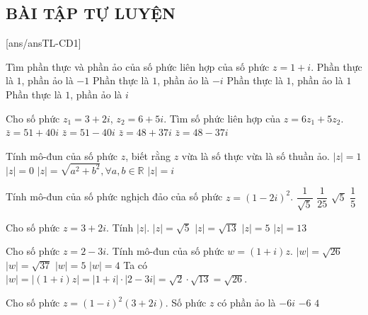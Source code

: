 \NOTE
\subsection{BÀI TẬP TỰ LUYỆN}
[ans/ansTL-CD1]
\setcounter{ex}{0}
\begin{ex}%
	Tìm phần thực và phần ảo của số phức liên hợp của số phức $z=1+i.$
	\choice
	{\True Phần thực là $1$, phần ảo là $-1$}
	{Phần thực là $1$, phần ảo là $-i$}
	{Phần thực là $1$, phần ảo là $1$}
	{Phần thực là $1$, phần ảo là $i$}
\end{ex}
\begin{ex}%
	Cho số phức $z_1=3+2i$, $z_2=6+5i$. Tìm số phức liên hợp của $z=6z_1+5z_2$.
	\choice
	{$\bar{z}=51+40i$}
	{$\bar{z}=51-40i$}
	{$\bar{z}=48+37i$}
	{\True $\bar{z}=48-37i$}
\end{ex}
\begin{ex}%
	Tính mô-đun của số phức $z$, biết rằng $z$ vừa là số thực vừa là số thuần ảo.
	\choice
	{$|z|=1$}
	{\True $|z|=0$}
	{$|z|=\sqrt{a^2+b^2}, \forall a,b\in\mathbb{R}$}
	{$|z|=i$}
\end{ex}
\begin{ex}%
	Tính mô-đun của số phức nghịch đảo của số phức $z=(1-2i)^2$.
	\choice
	{$\dfrac{1}{\sqrt{5}} $}
	{$\dfrac{1}{25} $}
	{$\sqrt{5} $}
	{\True $\dfrac{1}{5}$}
\end{ex}
\begin{ex}%
	Cho số phức $z=3+2i$. Tính $\left|z\right|$.
	\choice
	{$\left|z\right|=\sqrt 5$}
	{\True $\left|z\right|=\sqrt{13}$}
	{$\left|z\right|=5$}
	{$\left|z\right|=13$}
\end{ex}
\begin{ex}%
	Cho số phức $z=2-3i$. Tính mô-đun của số phức $w=(1+i)z$.
	\choice
	{\True $|w|=\sqrt{26}$}
	{$|w|=\sqrt{37}$}
	{$|w|=5$}
	{$|w|=4$}
	\loigiai
	{
		Ta có $|w|=|(1+i)z|=|1+i|\cdot|2-3i|=\sqrt{2}\cdot\sqrt{13}=\sqrt{26}$.
	}
\end{ex}
\begin{ex}%
	Cho số phức $z=(1-i)^2(3+2i)$. Số phức $z$ có phần ảo là
	{$-6i$}
	{\True $-6$}
	{$4$}
\end{ex}
